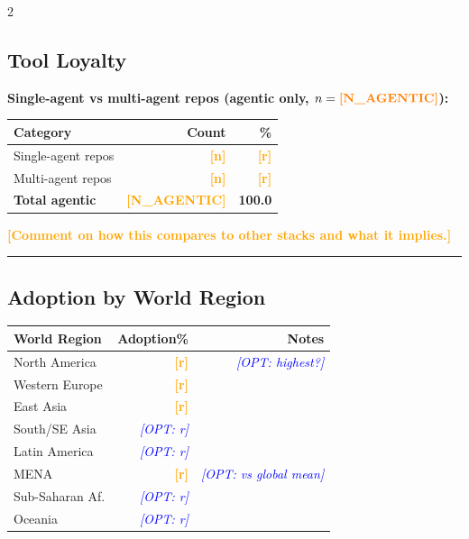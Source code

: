 \documentclass[10pt,a4paper]{article}
\newcommand{\FILLIN}[1]{\textcolor{orange}{\textbf{[#1]}}}
\newcommand{\OPT}[1]{\textcolor{blue}{\textit{[OPT: #1]}}}
\begin{document}
\begin{multicols}{2}
\footnotesize

\subsection*{Tool Loyalty}

\textbf{Single-agent vs multi-agent repos (agentic only, $n=\FILLIN{N\_AGENTIC}$):}

\vspace{2pt}
\begin{tabular}{@{}lrr@{}}
\toprule
Category & Count & \% \\
\midrule
Single-agent repos & \FILLIN{n} & \FILLIN{r} \\
Multi-agent repos  & \FILLIN{n} & \FILLIN{r} \\
\midrule
\textbf{Total agentic} & \textbf{\FILLIN{N\_AGENTIC}} & \textbf{100.0} \\
\bottomrule
\end{tabular}

\vspace{2pt}
{\small \FILLIN{Comment on how this compares to other stacks and what it implies.}}

\vspace{3pt}
\hrule
\vspace{3pt}

\subsection*{Adoption by World Region}

\vspace{2pt}
\begin{tabular}{@{}lrr@{}}
\toprule
World Region & Adoption\% & Notes \\
\midrule
North America   & \FILLIN{r} & \OPT{highest?} \\
Western Europe  & \FILLIN{r} & \\
East Asia       & \FILLIN{r} & \\
South/SE Asia   & \OPT{r}    & \\
Latin America   & \OPT{r}    & \\
MENA            & \FILLIN{r} & \OPT{vs global mean} \\
Sub-Saharan Af. & \OPT{r}    & \\
Oceania         & \OPT{r}    & \\
\bottomrule
\end{tabular}


\end{multicols}
\end{document}
